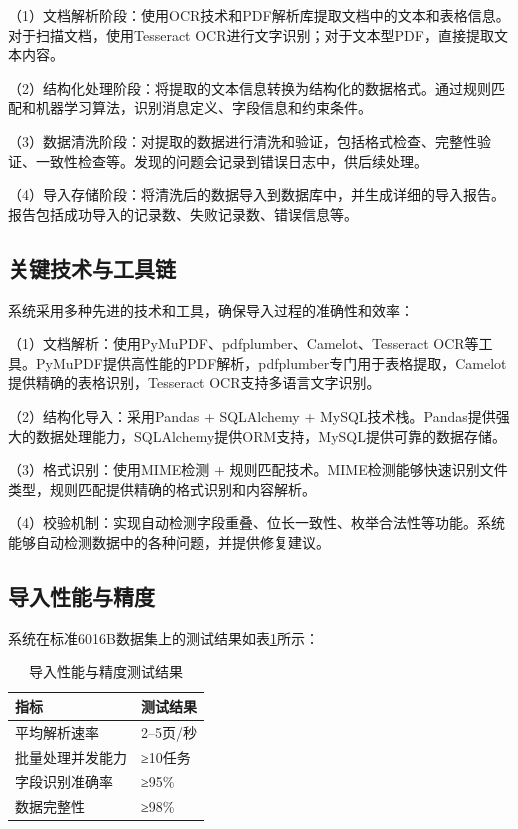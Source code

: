（1）文档解析阶段：使用OCR技术和PDF解析库提取文档中的文本和表格信息。对于扫描文档，使用Tesseract OCR进行文字识别；对于文本型PDF，直接提取文本内容。

（2）结构化处理阶段：将提取的文本信息转换为结构化的数据格式。通过规则匹配和机器学习算法，识别消息定义、字段信息和约束条件。

（3）数据清洗阶段：对提取的数据进行清洗和验证，包括格式检查、完整性验证、一致性检查等。发现的问题会记录到错误日志中，供后续处理。

（4）导入存储阶段：将清洗后的数据导入到数据库中，并生成详细的导入报告。报告包括成功导入的记录数、失败记录数、错误信息等。

\subsection{关键技术与工具链}

系统采用多种先进的技术和工具，确保导入过程的准确性和效率：

（1）文档解析：使用PyMuPDF、pdfplumber、Camelot、Tesseract OCR等工具。PyMuPDF提供高性能的PDF解析，pdfplumber专门用于表格提取，Camelot提供精确的表格识别，Tesseract OCR支持多语言文字识别。

（2）结构化导入：采用Pandas + SQLAlchemy + MySQL技术栈。Pandas提供强大的数据处理能力，SQLAlchemy提供ORM支持，MySQL提供可靠的数据存储。

（3）格式识别：使用MIME检测 + 规则匹配技术。MIME检测能够快速识别文件类型，规则匹配提供精确的格式识别和内容解析。

（4）校验机制：实现自动检测字段重叠、位长一致性、枚举合法性等功能。系统能够自动检测数据中的各种问题，并提供修复建议。

\subsection{导入性能与精度}

系统在标准6016B数据集上的测试结果如表\ref{table:import_performance}所示：

\begin{table}[H]
    \caption{导入性能与精度测试结果}
    \label{table:import_performance}
    \centering
    \begin{tabular}{|l|l|}
        \hline
        \textbf{指标} & \textbf{测试结果} \\
        \hline
        平均解析速率 & 2–5页/秒 \\
        批量处理并发能力 & ≥10任务 \\
        字段识别准确率 & ≥95\% \\
        数据完整性 & ≥98\% \\
        \hline
    \end{tabular}
\end{table}

